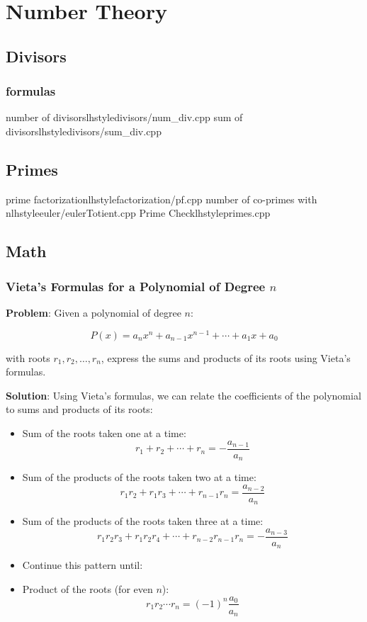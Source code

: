 \section{Number Theory}
    \subsection{Divisors}
       \subsubsection{formulas}
            {number of divisors}{lhstyle}{divisors/num_div.cpp}
            {sum of divisors}{lhstyle}{divisors/sum_div.cpp}
    \subsection{Primes}
         {prime factorization}{lhstyle}{factorization/pf.cpp}
         {number of co-primes with n}{lhstyle}{euler/eulerTotient.cpp}
         {Prime Check}{lhstyle}{primes.cpp}


    \subsection{Math}
        \subsubsection{Vieta's Formulas for a Polynomial of Degree \( n \)}

        \textbf{Problem}: Given a polynomial of degree \( n \):

        \[
        P(x) = a_n x^n + a_{n-1} x^{n-1} + \cdots + a_1 x + a_0
        \]

        with roots \( r_1, r_2, \ldots, r_n \), express the sums and products of its roots using Vieta's formulas.

        \textbf{Solution}:
        Using Vieta's formulas, we can relate the coefficients of the polynomial to sums and products of its roots:

        \begin{itemize}
            \item Sum of the roots taken one at a time:
            \[
            r_1 + r_2 + \cdots + r_n = -\frac{a_{n-1}}{a_n}
            \]
            \item Sum of the products of the roots taken two at a time:
            \[
            r_1r_2 + r_1r_3 + \cdots + r_{n-1}r_n = \frac{a_{n-2}}{a_n}
            \]
            \item Sum of the products of the roots taken three at a time:
            \[
            r_1r_2r_3 + r_1r_2r_4 + \cdots + r_{n-2}r_{n-1}r_n = -\frac{a_{n-3}}{a_n}
            \]
            \item Continue this pattern until:
            \item Product of the roots (for even \( n \)):
            \[
            r_1 r_2 \cdots r_n = (-1)^n \frac{a_0}{a_n}
            \]
        \end{itemize}

